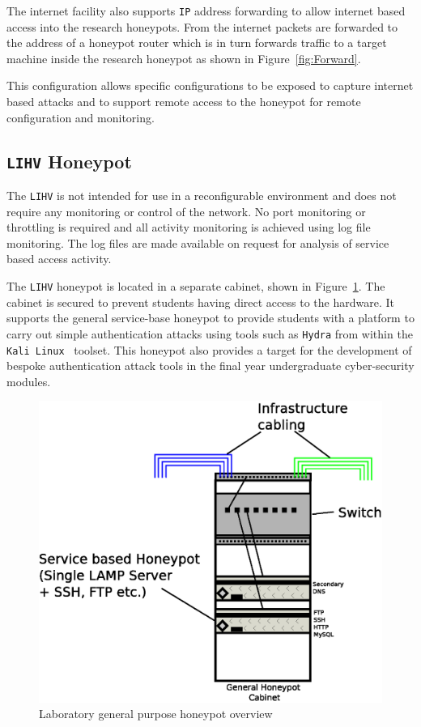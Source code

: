 The internet facility also supports \texttt{IP} address forwarding to allow
internet based access into the research honeypots. From the internet packets
are forwarded to the address of a honeypot router which is in turn forwards
traffic to a target machine inside the research honeypot as shown in
Figure~\ref{fig:Forward}.

This configuration allows specific configurations to be exposed to capture
internet based attacks and to support remote access to the honeypot for remote
configuration and monitoring.

\subsection{\texttt{LIHV} Honeypot}

The \texttt{LIHV} is not intended for use in a reconfigurable environment and
does not require any monitoring or control of the network. No port monitoring
or throttling is required and all activity monitoring is achieved using log
file monitoring. The log files are made available on request for analysis of
service based access activity.

The \texttt{LIHV} honeypot is located in a separate cabinet, shown in
Figure~\ref{fig:Overview2}. The cabinet is secured to prevent students having
direct access to the hardware. It supports the general service-base honeypot to
provide students with a platform to carry out simple authentication attacks
using tools such as \texttt{Hydra} from within the \texttt{Kali
Linux}~\cite{OS:17} toolset. This honeypot also provides a target for the
development of bespoke authentication attack tools in the final year
undergraduate cyber-security modules.

\begin{figure}[h]
\begin{center}
	\includegraphics[scale=0.4]{Images/Infrastructure2.eps}
\caption{Laboratory general purpose honeypot overview}
\label{fig:Overview2}
\end{center}
\end{figure}

